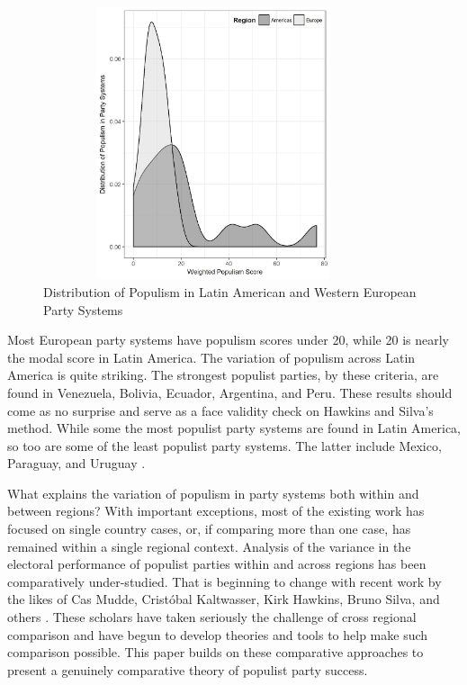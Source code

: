 \documentclass[a4paper,12pt]{article}\usepackage[]{graphicx}\usepackage[]{color}
\begin{document}
\par
\begin{figure}[!htbp]%
\centering
\parbox{4in}{\includegraphics[width=100mm, height = 80mm]{fig1.jpg}}%
\qquad
\caption{Distribution of Populism in Latin American and Western European Party Systems}%
\label{distribution}%
\end{figure}
Most European party systems have populism scores under 20, while 20 is nearly the modal score in Latin America. The variation of populism across Latin America is quite striking.  The strongest populist parties, by these criteria, are found in Venezuela, Bolivia, Ecuador, Argentina, and Peru. These results should come as no surprise and serve as a face validity check on Hawkins and Silva's method. While some the most populist party systems are found in Latin America, so too are some of the least populist party systems. The latter include Mexico, Paraguay, and Uruguay \citep{hawkins2015mapping}.
\par
What explains the variation of populism in party systems both within and between regions? With important exceptions, most of the existing work has focused on single country cases, or, if comparing more than one case, has remained within a single regional context. Analysis of the variance in the electoral performance of populist parties within and across regions has been comparatively under-studied. That is beginning to change with recent work by the likes of Cas Mudde, Crist{\'o}bal Kaltwasser, Kirk Hawkins,  Bruno Silva, and others \citep{mudde2011voices, mudde2013exclusionary, hawkins2015mapping}. These scholars have taken seriously the challenge of cross regional comparison and have begun to develop theories and tools to help make such comparison possible. This paper builds on these comparative approaches to present a genuinely comparative theory of populist party success.
\end{document}
